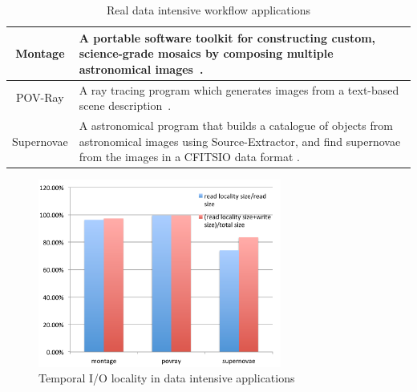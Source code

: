\begin{table}
\centering
\begin{tabular}{|c|p{150pt}|}
\hline
\cellcolor{lightgray} Montage	&
 A portable software toolkit for constructing custom, science-grade mosaics by
 composing multiple astronomical images~\cite{montage}.\\\hline 
\cellcolor{lightgray} POV-Ray   &
 A ray tracing program which generates images
 from a text-based scene description~\cite{povray}.\\\hline
\cellcolor{lightgray} Supernovae &	
 A astronomical program that builds a catalogue of
objects from astronomical images using Source-Extractor\cite{SExtractor}, 
and find supernovae from the images in a CFITSIO data format \cite{fitsio}.
\\ \hline
\end{tabular}
\caption{Real data intensive workflow applications}
\label{background:work flow applications}
\end{table}

\begin{figure}
\centering
\includegraphics[width=8cm]{img/data_locality.pdf}
\caption{Temporal I/O locality in data intensive applications}
\label{background:data locality}
\end{figure}

